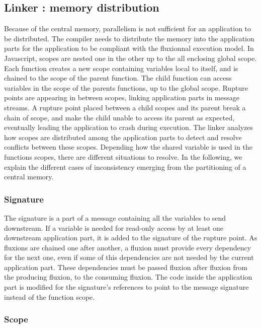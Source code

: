 \subsection{Linker : memory distribution} \label{section:linker}

Because of the central memory, parallelism is not sufficient for an application to be distributed.
The compiler needs to distribute the memory into the application parts for the application to be compliant with the fluxionnal execution model.
In Javascript, scopes are nested one in the other up to the all enclosing global scope.
Each function creates a new scope containing variables local to itself, and is chained to the scope of the parent function.
The child function can access variables in the scope of the parents functions, up to the global scope.
Rupture points are appearing in between scopes, linking application parts in message streams.
A rupture point placed between a child scopes and its parent break a chain of scope, and make the child unable to access its parent as expected, eventually leading the application to crash during execution.
The linker analyzes how scopes are distributed among the application parts to detect and resolve conflicts between these scopes.
Depending how the shared variable is used in the functions scopes, there are different situations to resolve.
In the following, we explain the different cases of inconsistency emerging from the partitioning of a central memory.

\subsubsection{Signature}

The signature is a part of a message containing all the variables to send downstream.
If a variable is needed for read-only access by at least one downstream application part, it is added to the signature of the rupture point.
As fluxions are chained one after another, a fluxion must provide every dependency for the next one, even if some of this dependencies are not needed by the current application part.
These dependencies must be passed fluxion after fluxion from the producing fluxion, to the consuming fluxion.
The code inside the application part is modified for the signature's references to point to the message signature instead of the function scope.

\subsubsection{Scope}

